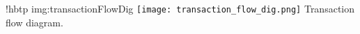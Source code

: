 \namedfigure
{!hbtp}
{img:transactionFlowDig}
{\texttt{[image: transaction\_flow\_dig.png]}}
{Transaction flow diagram.}
